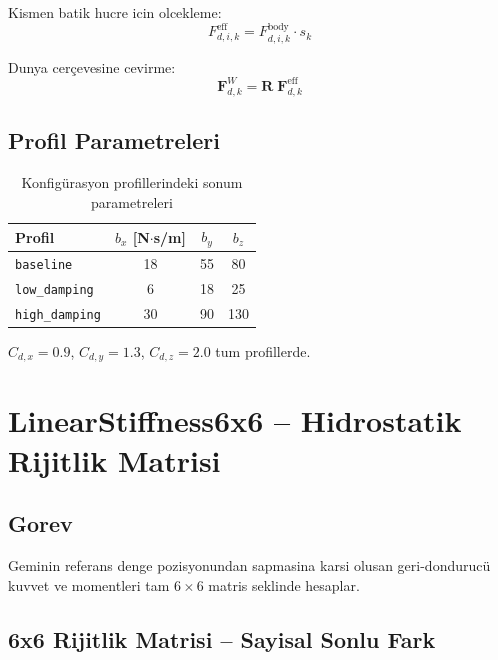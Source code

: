 \documentclass[12pt,a4paper]{article}
\begin{document}
Kismen batik hucre icin olcekleme:
\begin{equation}
  F_{d,i,k}^{\text{eff}} = F_{d,i,k}^{\text{body}} \cdot s_k
  \label{eq:drag_scaled}
\end{equation}

Dunya cerçevesine cevirme:
\begin{equation}
  \mathbf{F}_{d,k}^W = \mathbf{R}\;\mathbf{F}_{d,k}^{\text{eff}}
  \label{eq:drag_world}
\end{equation}

\subsection{Profil Parametreleri}

\begin{table}[H]
  \centering
  \caption{Konfigürasyon profillerindeki sonum parametreleri}
  \begin{tabular}{lccc}
    \toprule
    \textbf{Profil} & $b_x$ [N$\cdot$s/m] & $b_y$ & $b_z$ \\
    \midrule
    \texttt{baseline}      & 18  & 55  & 80  \\
    \texttt{low\_damping}  &  6  & 18  & 25  \\
    \texttt{high\_damping} & 30  & 90  & 130 \\
    \bottomrule
  \end{tabular}
  \par\smallskip
  {\small $C_{d,x}=0.9$, $C_{d,y}=1.3$, $C_{d,z}=2.0$ tum profillerde.}
\end{table}

\section{LinearStiffness6x6 -- Hidrostatik Rijitlik Matrisi}

\subsection{Gorev}

Geminin referans denge pozisyonundan sapmasina karsi olusan
geri-dondurucü kuvvet ve momentleri tam $6\times6$ matris seklinde hesaplar.

\subsection{6x6 Rijitlik Matrisi -- Sayisal Sonlu Fark}
\end{document}
